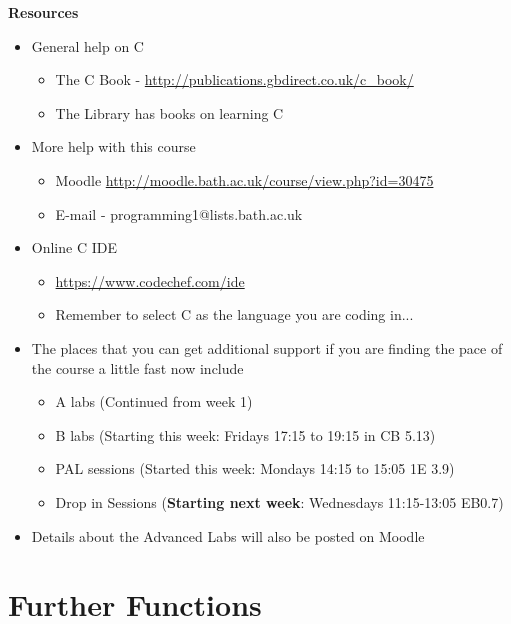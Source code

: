 \documentclass{beamer}
\begin{document}
\begin{frame} 
 
\textbf{Resources}
 
\begin{itemize}
\item General help on C
\begin{itemize}
\item The C Book - \url{http://publications.gbdirect.co.uk/c_book/}
\item The Library has books on learning C
\end{itemize}
\item More help with this course
\begin{itemize}
\item Moodle \url{http://moodle.bath.ac.uk/course/view.php?id=30475}
\item E-mail - programming1@lists.bath.ac.uk
\end{itemize}
\item Online C IDE
\begin{itemize}
\item \url{https://www.codechef.com/ide}
\item Remember to select C as the language you are coding in...
\end{itemize}
\end{itemize}
\end{frame}

\begin{frame} 
\begin{itemize}
\item The places that you can get additional support if you are finding the pace of the course a little fast now include
\begin{itemize}
\item A labs (Continued from week 1)
\item B labs (Starting this week: Fridays 17:15 to 19:15 in CB 5.13)
\item PAL sessions (Started this week: Mondays 14:15 to 15:05 1E 3.9)
\item Drop in Sessions (\textbf{Starting next week}: Wednesdays 11:15-13:05 EB0.7)
\end{itemize}
\bigskip
\item Details about the Advanced Labs will also be posted on Moodle
\end{itemize}
\end{frame}

\section{Further Functions}
\end{document}
